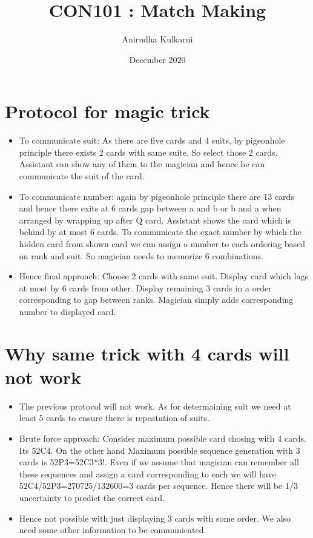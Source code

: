 \documentclass{article}
\title{CON101 : Match Making}
\author{Anirudha Kulkarni}
\date{December 2020}
\begin{document}
\maketitle
\section{Protocol for magic trick}
\begin{itemize}
    \item  To communicate suit: As there are five cards and 4 suits, by pigeonhole principle there exists 2 cards with same suite. So select those 2 cards. Assistant can show any of them to the magician and hence he can communicate the suit of the card.
    \item To communicate number: again by pigeonhole principle there are 13 cards and hence there exits at 6 cards gap between a and b or b and a when arranged by wrapping up after Q card. Assistant shows the card which is behind by at most 6 cards. To communicate the exact number by which the hidden card from shown card we can assign a number to each ordering based on rank and suit. So magician needs to memorize 6 combinations.
    \item Hence final approach: Choose 2 cards with same suit. Display card which lags at most by 6 cards from other. Display remaining 3 cards in a order corresponding to gap between ranks. Magician simply adds corresponding number to displayed card.
\end{itemize}
\section{Why same trick with 4 cards will not work}
\begin{itemize}
    \item The previous protocol will not work. As for determaining suit we need at least 5 cards to ensure there is repeatation of suits.
    \item Brute force approach: Consider maximum possible card chosing with 4 cards. Its 52C4. On the other hand Maximum possible sequence generation with 3 cards is 52P3=52C3*3!. Even if we assume that magician can remember all these sequences and assign a card corresponding to each we will have 52C4/52P3=270725/132600=3 cards per sequence. Hence there will be 1/3 uncertainty to predict the correct card.
    \item Hence not possible with just displaying 3 cards with some order. We also need some other information to be communicated.
\end{itemize}
\end{document}
